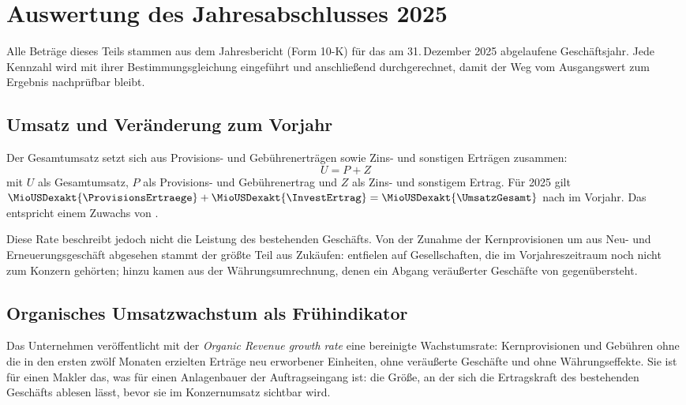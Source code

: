 \section{Auswertung des Jahresabschlusses 2025}

Alle Betr\"age dieses Teils stammen aus dem Jahresbericht (Form 10-K) f\"ur
das am 31.\,Dezember 2025 abgelaufene Gesch\"aftsjahr. Jede Kennzahl wird
mit ihrer Bestimmungsgleichung eingef\"uhrt und anschlie{\ss}end
durchgerechnet, damit der Weg vom Ausgangswert zum Ergebnis nachpr\"ufbar
bleibt.

\subsection{Umsatz und Ver\"anderung zum Vorjahr}

Der Gesamtumsatz setzt sich aus Provisions- und Geb\"uhrenertr\"agen sowie
Zins- und sonstigen Ertr\"agen zusammen:
\begin{equation}
\label{eq:umsatz-zusammensetzung}
U = P + Z
\end{equation}
mit $U$ als Gesamtumsatz, $P$ als Provisions- und Geb\"uhrenertrag und $Z$
als Zins- und sonstigem Ertrag. F\"ur 2025 gilt
$\MioUSDexakt{\ProvisionsErtraege} + \MioUSDexakt{\InvestErtrag} =
\MioUSDexakt{\UmsatzGesamt}$ nach \MioUSDexakt{\UmsatzGesamtVJ} im
Vorjahr. Das entspricht einem Zuwachs
von \Pct{\UmsatzDelta}.

Diese Rate beschreibt jedoch nicht die Leistung des bestehenden
Gesch\"afts. Von der Zunahme der Kernprovisionen um
\MioUSDexakt{\OrganischNeugeschaeft} aus Neu- und Erneuerungsgesch\"aft
abgesehen stammt der gr\"o{\ss}te Teil aus Zuk\"aufen:
\MioUSDexakt{\UmsatzAusZukaeufenMDA} entfielen auf Gesellschaften, die im
Vorjahreszeitraum noch nicht zum Konzern geh\"orten; hinzu kamen
\MioUSDexakt{\WaehrungseffektMDA} aus der W\"ahrungsumrechnung, denen ein
Abgang ver\"au{\ss}erter Gesch\"afte von \MioUSDexakt{\DesinvestitionMDA}
gegen\"ubersteht.

\subsection{Organisches Umsatzwachstum als Fr\"uhindikator}
\label{sec:organisch}

Das Unternehmen ver\"offentlicht mit der \emph{Organic Revenue growth rate}
eine bereinigte Wachstumsrate: Kernprovisionen und Geb\"uhren ohne die in
den ersten zw\"olf Monaten erzielten Ertr\"age neu erworbener Einheiten,
ohne ver\"au{\ss}erte Gesch\"afte und ohne W\"ahrungseffekte.
Sie ist f\"ur einen Makler das, was f\"ur einen Anlagenbauer der
Auftragseingang ist: die Gr\"o{\ss}e, an der sich die Ertragskraft des
bestehenden Gesch\"afts ablesen l\"asst, bevor sie im Konzernumsatz sichtbar
wird.

